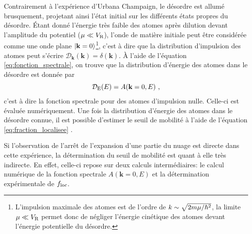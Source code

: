 Contrairement à l'expérience d'Urbana Champaign, le désordre est allumé brusquement, projetant ainsi l'état initial sur les différents états propres du désordre. Étant donné l'énergie très faible des atomes après dilution devant l'amplitude du potentiel ($\mu\ll V_{\mathrm{R}}$), l'onde de matière initiale peut être considérée comme une onde plane $\left| \mathbf{k}=0 \right\rangle$\footnote{L'impulsion maximale des atomes est de l'ordre de $k\sim\sqrt{2m\mu/\hslash^2}$, la limite $\mu\ll V_{\mathrm{R}}$ permet donc de négliger l'énergie cinétique des atomes devant l'énergie potentielle du désordre.}, c'est à dire  que la distribution d'impulsion des atomes peut s'écrire $\mathcal{D}_{\mathbf{k}}(\mathbf{k})=\delta(\mathbf{k})$. À l'aide de l'équation \ref{eq:fonction_spectrale}, on trouve que la distribution d'énergie des atomes dans le désordre est donnée par 
\begin{equation}
\mathcal{D}_{\mathrm{E}}(E) = A(\mathbf{k}=0,E) \text{ ,}
\end{equation}
c'est à dire la fonction spectrale pour des atomes d'impulsion nulle. Celle-ci est évaluée numériquement. Une fois la distribution d'énergie des atomes dans le désordre connue, il est possible d'estimer le seuil de mobilité à l'aide de l'équation \ref{eq:fraction_localisee} \citep{piraud2012localisation}.

Si l'observation de l'arrêt de l'expansion d'une partie du nuage est directe dans cette expérience, la détermination du seuil de mobilité est quant à elle très indirecte. En effet, celle-ci repose sur deux calculs intermédiaires: le calcul numérique de la fonction spectrale $A(\mathbf{k}=0,E)$ et la détermination expérimentale de $f_{\mathrm{loc}}$. 



